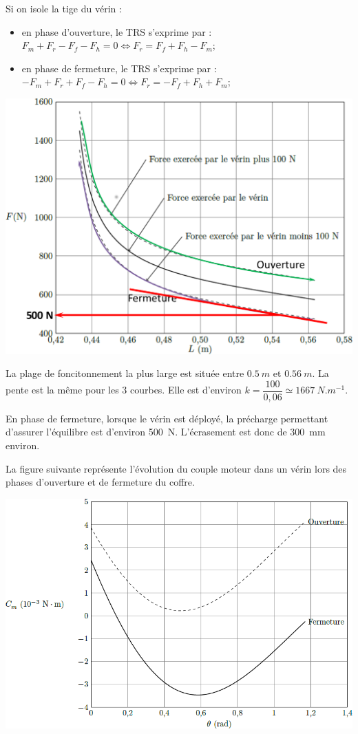 \documentclass[10pt,fleqn]{article} %
\begin{document}
\begin{multicols}{2}
\begin{corrige}
Si on isole la tige du vérin :
\begin{itemize}
\item en phase d'ouverture, le TRS s'exprime par : $F_m + F_r - F_f - F_h =0\Leftrightarrow F_r = F_f + F_h - F_m$; 
\item en phase de fermeture, le TRS s'exprime par : $-F_m + F_r + F_f - F_h =0 \Leftrightarrow F_r = -F_f + F_h + F_m$;
\end{itemize}


\begin{center}
\includegraphics[width=\linewidth]{images/cor_05}
\end{center}


La plage de foncitonnement la plus large est située entre $\SI{0,5}{m}$ et $\SI{0,56}{m}$. La pente est la même pour les 3 courbes. Elle est d'environ $k=\dfrac{100}{0,06}\simeq \SI{1667}{N.m^{-1}}$.

En phase de fermeture, lorsque le vérin est déployé, la précharge permettant d'assurer l'équilibre est d'environ \SI{500}{N}.  L'écrasement est donc  de \SI{300}{mm} environ.

\end{corrige}
\else
\fi

La figure suivante représente l’évolution du couple moteur dans un vérin lors des phases d’ouverture et de fermeture
du coffre.


\begin{center}
\includegraphics[width=.8\linewidth]{images/fig_04}
\end{center}


\end{multicols}
\end{document}
